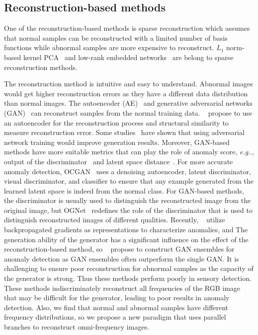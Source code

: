\documentclass[lettersize,journal]{IEEEtran}
\makeatletter
\DeclareRobustCommand\onedot{\futurelet\@let@token\@onedot}
\def\@onedot{\ifx\@let@token.\else.\null\fi\xspace}
\def\eg{\emph{e.g}\onedot} \def\Eg{\emph{E.g}\onedot}
\makeatother
\begin{document}
\subsection{Reconstruction-based methods}
One of the reconstruction-based methods is sparse reconstruction which assumes that normal samples can be reconstructed with a limited number of basis functions while abnormal samples are more expensive to reconstruct. $L_1$ norm-based kernel PCA~\cite{xiao2013l1} and low-rank embedded networks~\cite{jiang2021lren} are belong to sparse reconstruction methods.

 The reconstruction method is intuitive and easy to understand. Abnormal images would get higher reconstruction errors as they have a different data distribution than normal images. The autoencoder (AE)~\cite{kingma2014auto} and generative adversarial networks (GAN)~\cite{goodfellow2014generative} can reconstruct samples from the normal training data. ~\cite{bergmann2018improving} propose to use an autoencoder for the reconstruction process and structural similarity to measure reconstruction error. Some studies~\cite{goodfellow2014generative, pathak2016context} have shown that using adversarial network training would improve generation results. Moreover, GAN-based methods have more suitable metrics that can play the role of anomaly score, \eg, output of the discriminator~\cite{sabokrou2018adversarially, akcay2018ganomaly} and latent space distance~\cite{abati2019latent, akcay2018ganomaly, akccay2019skip}.  %
 For more accurate anomaly detection, OCGAN~\cite{perera2019ocgan} uses a denoising autoencoder, latent discriminator, visual discriminator, and classifier to ensure that any example generated from the learned latent space is indeed from the normal class. For GAN-based methods, the discriminator is usually used to distinguish the reconstructed image from the original image, but OGNet~\cite{zaheer2020old} redefines the role of the discriminator that is used to distinguish reconstructed images of different qualities. Recently, ~\cite{kwon2020backpropagated} utilize backpropagated gradients as representations to characterize anomalies, and %
 The generation ability of the generator has a significant influence on the effect of the reconstruction-based method, so ~\cite{han2021gan} propose to construct GAN ensembles for anomaly detection as GAN ensembles often outperform the single GAN. %
 It is challenging to ensure poor reconstruction for abnormal samples as the capacity of the generator is strong. Thus these methods perform poorly in sensory detection. These methods indiscriminately reconstruct all frequencies of the RGB image that may be difficult for the generator, leading to poor results in anomaly detection. Also, we find that normal and abnormal samples have different frequency distributions, so we propose a new paradigm that uses parallel branches to reconstruct omni-frequency images.
\end{document}
